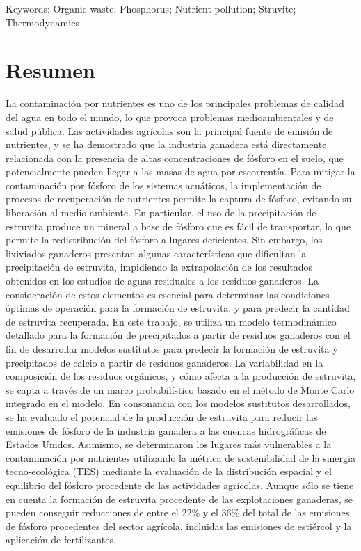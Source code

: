 Keywords: Organic waste; Phosphorus; Nutrient pollution; Struvite; Thermodynamics

\newpage

\section*{Resumen}
La contaminación por nutrientes es uno de los principales problemas de calidad del agua en todo el mundo, lo que provoca problemas medioambientales y de salud pública. Las actividades agrícolas son la principal fuente de emisión de nutrientes, y se ha demostrado que la industria ganadera está directamente relacionada con la presencia de altas concentraciones de fósforo en el suelo, que potencialmente pueden llegar a las masas de agua por escorrentía. Para mitigar la contaminación por fósforo de los sistemas acuáticos, la implementación de procesos de recuperación de nutrientes permite la captura de fósforo, evitando su liberación al medio ambiente. En particular, el uso de la precipitación de estruvita produce un mineral a base de fósforo que es fácil de transportar, lo que permite la redistribución del fósforo a lugares deficientes. Sin embargo, los lixiviados ganaderos presentan algunas características que dificultan la precipitación de estruvita, impidiendo la extrapolación de los resultados obtenidos en los estudios de aguas residuales a los residuos ganaderos. La consideración de estos elementos es esencial para determinar las condiciones óptimas de operación para la formación de estruvita, y para predecir la cantidad de estruvita recuperada. En este trabajo, se utiliza un modelo termodinámico detallado para la formación de precipitados a partir de residuos ganaderos con el fin de desarrollar modelos sustitutos para predecir la formación de estruvita y precipitados de calcio a partir de residuos ganaderos. La variabilidad en la composición de los residuos orgánicos, y cómo afecta a la producción de estruvita, se capta a través de un marco probabilístico basado en el método de Monte Carlo integrado en el modelo. En consonancia con los modelos sustitutos desarrollados, se ha evaluado el potencial de la producción de estruvita para reducir las emisiones de fósforo de la industria ganadera a las cuencas hidrográficas de Estados Unidos. Asimismo, se determinaron los lugares más vulnerables a la contaminación por nutrientes utilizando la métrica de sostenibilidad de la sinergia tecno-ecológica (TES) mediante la evaluación de la distribución espacial y el equilibrio del fósforo procedente de las actividades agrícolas. Aunque sólo se tiene en cuenta la formación de estruvita procedente de las explotaciones ganaderas, se pueden conseguir reducciones de entre el 22\% y el 36\% del total de las emisiones de fósforo procedentes del sector agrícola, incluidas las emisiones de estiércol y la aplicación de fertilizantes.

